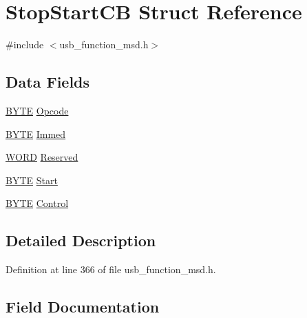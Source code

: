 \hypertarget{struct_stop_start_c_b}{}\section{Stop\+Start\+C\+B Struct Reference}
\label{struct_stop_start_c_b}


{\ttfamily \#include $<$usb\+\_\+function\+\_\+msd.\+h$>$}

\subsection*{Data Fields}
\begin{DoxyCompactItemize}
\item 
\hyperlink{_generic_type_defs_8h_a4ae1dab0fb4b072a66584546209e7d58}{B\+Y\+T\+E} \hyperlink{struct_stop_start_c_b_a3ac7536b907732d60214ae553910eed9}{Opcode}
\item 
\hyperlink{_generic_type_defs_8h_a4ae1dab0fb4b072a66584546209e7d58}{B\+Y\+T\+E} \hyperlink{struct_stop_start_c_b_a6702d02885cabae31194bbf01830f5d3}{Immed}
\item 
\hyperlink{_generic_type_defs_8h_a2b0e863dadf920709ec53d9088ee7c91}{W\+O\+R\+D} \hyperlink{struct_stop_start_c_b_a3aef54172eb78efe737c8eb7b0093d3c}{Reserved}
\item 
\hyperlink{_generic_type_defs_8h_a4ae1dab0fb4b072a66584546209e7d58}{B\+Y\+T\+E} \hyperlink{struct_stop_start_c_b_a0f967bae823a6ead3de270c3afe9435d}{Start}
\item 
\hyperlink{_generic_type_defs_8h_a4ae1dab0fb4b072a66584546209e7d58}{B\+Y\+T\+E} \hyperlink{struct_stop_start_c_b_a5dc24656c27deb12af74c98930f0bfc5}{Control}
\end{DoxyCompactItemize}


\subsection{Detailed Description}


Definition at line 366 of file usb\+\_\+function\+\_\+msd.\+h.



\subsection{Field Documentation}
\hypertarget{struct_stop_start_c_b_a5dc24656c27deb12af74c98930f0bfc5}{}
